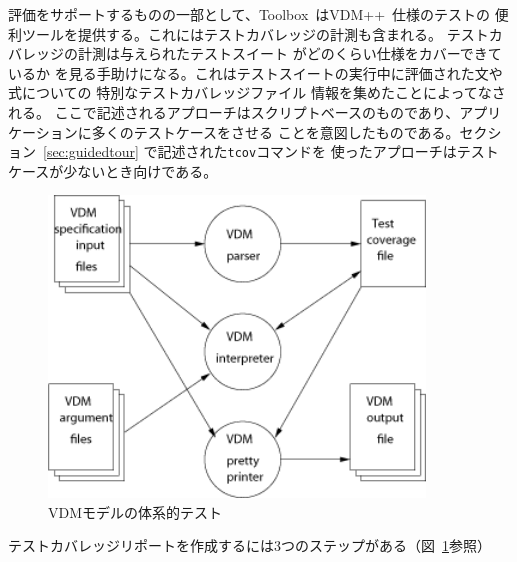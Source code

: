 \documentclass[\pformat,12pt]{jarticle}
\newcommand{\vdmslpp}{VDM++}
\newcommand{\Toolbox}{Toolbox}
\begin{document}
評価をサポートするものの一部として、\Toolbox\ は\vdmslpp\ 仕様のテストの
便利ツールを提供する。これにはテストカバレッジの計測も含まれる。
テストカバレッジの計測は与えられたテストスイート
 がどのくらい仕様をカバーできているか
を見る手助けになる。これはテストスイートの実行中に評価された文や式についての
特別なテストカバレッジファイル 情報を集めたことによってなされる。
ここで記述されるアプローチはスクリプトベースのものであり、アプリケーションに多くのテストケースをさせる
ことを意図したものである。セクション~\ref{sec:guidedtour} で記述された\texttt{tcov}コマンドを
使ったアプローチはテストケースが少ないとき向けである。

\begin{figure}[tbh]
\begin{center}
\includegraphics[width=10cm]{testenv.png}
\caption{VDMモデルの体系的テスト}
\label{fig:testenv}
\end{center}
\end{figure}

テストカバレッジリポートを作成するには3つのステップがある（図~\ref{fig:testenv}参照）
\end{document}
